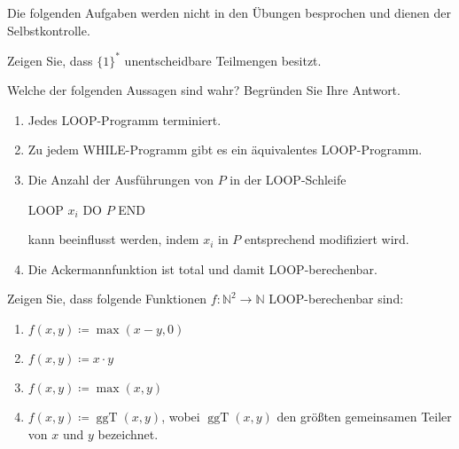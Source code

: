 \documentclass[german]{latteachCD}[2017/03/28]
\begin{document}
\maketitle

\begin{mdframed}
  Die folgenden Aufgaben werden nicht in den Übungen besprochen und dienen der
  Selbstkontrolle.

  \renewcommand{\theexercise}{\Alph{exercise}}
  \setcounter{exercise}{2}

  \begin{exercise}
    Zeigen Sie, dass $\{1\}^{*}$ unentscheidbare Teilmengen besitzt.
  \end{exercise}

  \begin{exercise}
    Welche der folgenden Aussagen sind wahr? Begründen Sie Ihre Antwort.
    \begin{enumerate}
    \item Jedes LOOP-Programm terminiert.
    \item Zu jedem WHILE-Programm gibt es ein äquivalentes LOOP-Programm.
    \item Die Anzahl der Ausführungen von $P$ in der LOOP-Schleife
      \begin{center}
        \ttfamily LOOP $x_{i}$ DO $P$ END
      \end{center}
      kann beeinflusst werden, indem $x_{i}$ in $P$ entsprechend modifiziert wird.
    \item Die Ackermannfunktion ist total und damit LOOP-berechenbar.
    \end{enumerate}
  \end{exercise}
\end{mdframed}

\vspace*{\baselineskip}

\setcounter{exercise}{0}

\begin{exercise}
  Zeigen Sie, dass folgende Funktionen $f\colon \mathbb N^{2} \to \mathbb
  N$ LOOP-berechenbar sind:
  \begin{enumerate}
  \item $f(x,y) \coloneqq \max(x - y, 0)$
  \item $f(x,y) \coloneqq x \cdot y$
  \item $f(x,y) \coloneqq \max(x,y)$
  \item $f(x,y) \coloneqq \operatorname{ggT}(x,y)$, wobei
    $\operatorname{ggT}(x,y)$ den größten gemeinsamen Teiler von $x$ und $y$ bezeichnet.
  \end{enumerate}
\end{exercise}
\end{document}
